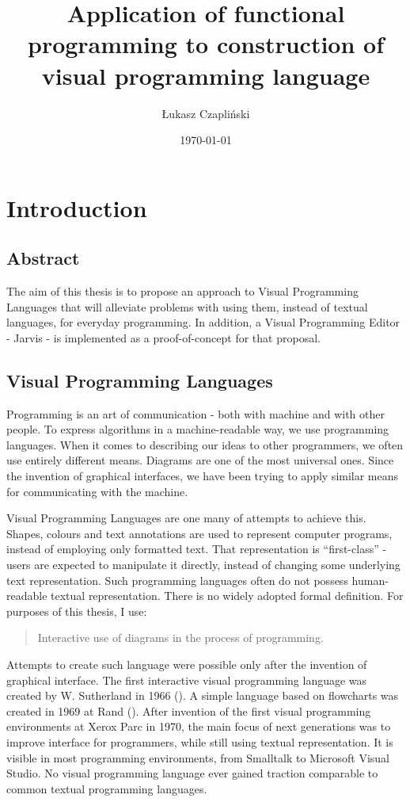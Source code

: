 \documentclass[11pt]{scrartcl}
\title{Application of functional programming to construction of visual
  programming language}
\author{Łukasz Czapliński}
\date{\today}
\begin{document}
\maketitle

\section{Introduction}
\subsection{Abstract}
The aim of this thesis is to propose an approach to  Visual Programming
Languages that will alleviate problems with using them, instead of textual
languages, for everyday programming.
In addition, a Visual Programming Editor - Jarvis - is implemented as a
proof-of-concept for that proposal.

\subsection{Visual Programming Languages}
Programming is an art of communication - both with machine and with other
people.
To express algorithms in a machine-readable way, we use programming languages.
When it comes to describing our ideas to other programmers, we often use
entirely different means.
Diagrams are one of the most universal ones.
Since the invention of graphical interfaces, we have been trying to apply
similar means for communicating with the machine.

Visual Programming Languages are one many of attempts to achieve this.
Shapes, colours and text annotations are used to represent computer programs,
instead of employing only formatted text.
That representation is “first-class” - users are expected to manipulate it
directly, instead of changing some underlying text representation.
Such programming languages often do not possess human-readable textual
representation.
There is no widely adopted formal definition.
For purposes of this thesis, I use:
\blockquote[{\cite[Chapter 2]{nickerson1995visual}}]{Interactive use of diagrams
  in the process of programming.}


Attempts to create such language were possible only after the invention of
graphical interface.
The first interactive visual programming language was created by W. Sutherland
in 1966 (\cite{firstVPL}).
A simple language based on flowcharts was created in 1969 at Rand (\cite{grail}).
After invention of the first visual programming environments at Xerox Parc in
1970, the main focus of next generations was to improve interface for
programmers, while still using textual representation.
It is visible in most programming environments, from Smalltalk to Microsoft
Visual Studio.
No visual programming language ever gained traction comparable to common textual
programming languages.
\end{document}
